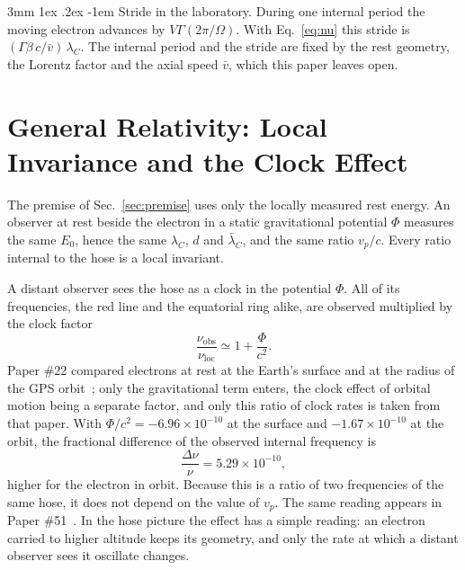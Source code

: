 \documentclass[%
 reprint, amsmath,amssymb, aps, prb, ]{revtex4-2}
\makeatletter
\numberwithin{equation}{section}
\renewcommand\paragraph{%
  \@startsection{paragraph}{4}{\z@}%
    {3mm \@plus 1ex \@minus .2ex}%
    {-1em}%
    {\normalfont\normalsize\itshape}}
\newcommand{\lamC}{\lambda_C}
\newcommand{\lbar}{\bar{\lambda}_C}
\makeatother
\begin{document}
\paragraph{Stride in the laboratory.} During one internal period the moving electron advances by $V\Gamma(2\pi/\Omega)$. With Eq.~\eqref{eq:nu} this stride is $(\Gamma\beta\,c/\bar v)\,\lamC$. The internal period and the stride are fixed by the rest geometry, the Lorentz factor and the axial speed $\bar v$, which this paper leaves open.

\section{General Relativity: Local Invariance and the Clock Effect}
\label{sec:gr}

The premise of Sec.~\ref{sec:premise} uses only the locally measured rest energy. An observer at rest beside the electron in a static gravitational potential $\Phi$ measures the same $E_0$, hence the same $\lamC$, $d$ and $\lbar$, and the same ratio $v_p/c$. Every ratio internal to the hose is a local invariant.

A distant observer sees the hose as a clock in the potential $\Phi$. All of its frequencies, the red line and the equatorial ring alike, are observed multiplied by the clock factor~\cite{PoundRebka1960}
\begin{equation}
\frac{\nu_{\text{obs}}}{\nu_{\text{loc}}} \simeq 1 + \frac{\Phi}{c^2} .
\label{eq:redshift}
\end{equation}
Paper \#22 compared electrons at rest at the Earth's surface and at the radius of the GPS orbit~\cite{H22}; only the gravitational term enters, the clock effect of orbital motion being a separate factor, and only this ratio of clock rates is taken from that paper. With $\Phi/c^2 = -6.96\times10^{-10}$ at the surface and $-1.67\times10^{-10}$ at the orbit, the fractional difference of the observed internal frequency is
\begin{equation}
\frac{\Delta\nu}{\nu} = 5.29\times10^{-10},
\label{eq:dnu}
\end{equation}
higher for the electron in orbit. Because this is a ratio of two frequencies of the same hose, it does not depend on the value of $v_p$. The same reading appears in Paper \#51~\cite{H51}. In the hose picture the effect has a simple reading: an electron carried to higher altitude keeps its geometry, and only the rate at which a distant observer sees it oscillate changes.
\end{document}
